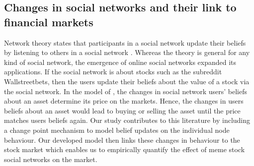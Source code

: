 \subsection{Changes in social networks and their link to financial markets}
Network theory states that participants in a social network update their beliefs by listening to others in a social network \citep{DeGroot1974}. Whereas the theory is general for any kind of social network, the emergence of online social networks expanded its applications. If the social network is about stocks such as the subreddit Wallstreetbets, then the users update their beliefs about the value of a stock via the social network. In the model of \citet{Pedersen2022}, the changes in social network users' beliefs about an asset determine its price on the markets. Hence, the changes in users beliefs about an asset would lead to buying or selling the asset until the price matches users beliefs again. 
Our study contributes to this literature by including a change point mechanism to model belief updates on the individual node behaviour. Our developed model then links these changes in behaviour to the stock market which enables us to empirically quantify the effect of meme stock social networks on the market.


